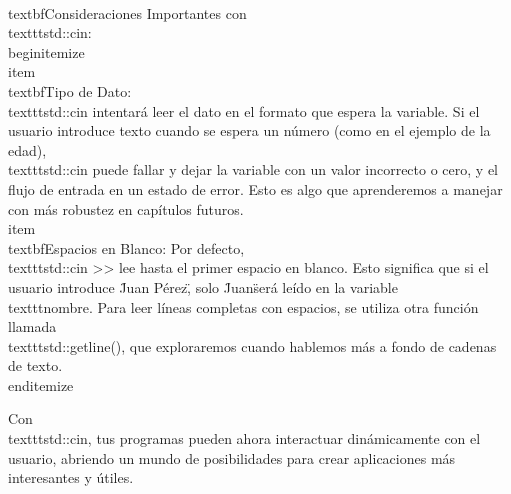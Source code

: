 \\textbf{Consideraciones Importantes con \\texttt{std::cin}:}
\\begin{itemize}
    \\item \\textbf{Tipo de Dato:} \\texttt{std::cin} intentará leer el dato en el formato que espera la variable. Si el usuario introduce texto cuando se espera un número (como en el ejemplo de la edad), \\texttt{std::cin} puede fallar y dejar la variable con un valor incorrecto o cero, y el flujo de entrada en un estado de error. Esto es algo que aprenderemos a manejar con más robustez en capítulos futuros.
    \\item \\textbf{Espacios en Blanco:} Por defecto, \\texttt{std::cin >>} lee hasta el primer espacio en blanco. Esto significa que si el usuario introduce \"Juan Pérez\", solo \"Juan\" será leído en la variable \\texttt{nombre}. Para leer líneas completas con espacios, se utiliza otra función llamada \\texttt{std::getline()}, que exploraremos cuando hablemos más a fondo de cadenas de texto.
\\end{itemize}

Con \\texttt{std::cin}, tus programas pueden ahora interactuar dinámicamente con el usuario, abriendo un mundo de posibilidades para crear aplicaciones más interesantes y útiles.